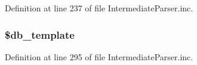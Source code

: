 \-Definition at line 237 of file \-Intermediate\-Parser.\-inc.

\hypertarget{classphp_documentor___intermediate_parser_afcf109f9936f33068c9cda5404751d8a}{
\subsubsection[{\$db\-\_\-template}]{\setlength{\rightskip}{0pt plus 5cm}\$db\-\_\-template}}\label{classphp_documentor___intermediate_parser_afcf109f9936f33068c9cda5404751d8a}


\-Definition at line 295 of file \-Intermediate\-Parser.\-inc.

